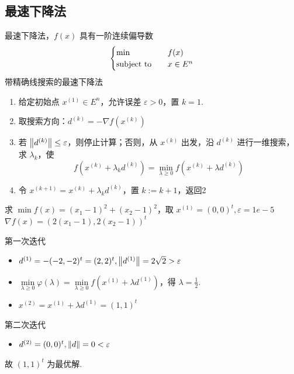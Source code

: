 \subsection{最速下降法}
\begin{remark}
    最速下降法，$f(x)$ 具有一阶连续偏导数 \[\begin{cases}
        \min \quad &f(x)\\
        \operatorname{subject\ to} \quad &x \in E^n
    \end{cases}\]
    带精确线搜索的最速下降法 \begin{enumerate}
        \item 给定初始点 $x^{(1)} \in E^n$，允许误差 $\varepsilon > 0$，置 $k = 1$.
        \item 取搜索方向：$d^{(k)} = -\nabla f(x^{(k)})$
        \item 若 $\norm{d^{(k)}} \le \varepsilon$，则停止计算；否则，从 $x^{(k)}$ 出发，沿 $d^{(k)}$ 进行一维搜索，求 $\lambda_k$，使 \[f(x^{(k)} + \lambda_k d^{(k)}) = \min_{\lambda \ge 0} f(x^{(k)} + \lambda d^{(k)})\]
        \item 令 $x^{(k + 1)} = x^{(k)} + \lambda_k d^{(k)}$，置 $k := k + 1$，返回2
    \end{enumerate}
\end{remark}

\begin{example}
    求 $\min f(x) = (x_1 - 1)^2 + (x_2 - 1)^2$，取 $x^{(1)} = (0, 0)^t, \varepsilon = 1e-5$
    \Answer $\nabla f(x) = (2(x_1 - 1), 2(x_2 - 1))^t$

    第一次迭代\begin{itemize}
        \item $d^{(1)} = -(-2, -2)^t = (2, 2)^t, \norm{d^{(1)}} = 2\sqrt{2} > \varepsilon$
        \item $\underset{\lambda \ge 0}{\min} \varphi(\lambda) = \underset{\lambda \ge 0}{\min} f(x^{(1)} + \lambda d^{(1)})$，得 $\lambda = \frac{1}{2}$.
        \item $x^{(2)} = x^{(1)} + \lambda d^{(1)} = (1, 1)^t$
    \end{itemize}
    第二次迭代\begin{itemize}
        \item $d^{(2)} = (0, 0)^t, \norm{d} = 0 < \varepsilon$
    \end{itemize}
    故 $(1, 1)^t$ 为最优解.
\end{example}

